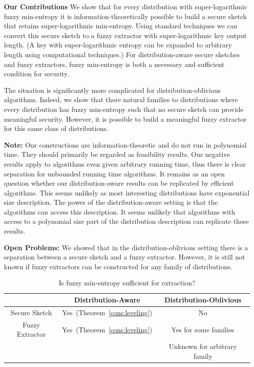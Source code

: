 \documentclass[11pt]{article}
\newcommand{\thref}[1]{\mbox{Theorem~\ref{#1}}}
\newcommand{\Hfuzz}{\mathrm{H}^{\mathtt{fuzz}}_{t,\infty}}
\begin{document}
\textbf{Our Contributions} We show that for every distribution with super-logarithmic fuzzy min-entropy it is information-theoretically possible to build a secure sketch that retains super-logarithmic min-entropy.  Using standard techniques we can convert this secure sketch to a fuzzy extractor with super-logarithmic key output length.  (A key with super-logarithmic entropy can be expanded to arbitrary length using computational techniques.)  For distribution-aware secure sketches and fuzzy extractors, fuzzy min-entropy is both a necessary and sufficient condition for security.  

The situation is significantly more complicated for distribution-oblivious algorithms.  Indeed, we show that there natural families to distributions where every distribution has fuzzy min-entropy such that no secure sketch can provide meaningful security.  However, it is possible to build a meaningful fuzzy extractor for this same class of distributions.

\textbf{Note:} Our constructions are information-theoretic and do not run in polynomial time.  They should primarily be regarded as feasibility results.  Our negative results apply to algorithms even given arbitrary running time, thus there is clear separation for unbounded running time algorithms.  It remains as an open question whether our distribution-aware results can be replicated by efficient algorithms.  This seems unlikely as most  interesting distributions have exponential size description.  The power of the distribution-aware setting is that the algorithms can access this description.  It seems unlikely that algorithms with access to a polynomial size part of the distribution description can replicate these results.

\textbf{Open Problems:} We showed that in the distribution-oblivious setting there is a separation between a secure sketch and a fuzzy extractor.  However, it is still not known if fuzzy extractors can be constructed for any family of distributions.

\begin{table}
\begin{center}
\begin{tabular}{c | c | c }
& Distribution-Aware & Distribution-Oblivious\\
\hline
Secure Sketch & Yes~(\thref{cons:leveling}) & No\\
\hline
Fuzzy Extractor & Yes~(\thref{cons:leveling}) & Yes for some families\\
& & Unknown for arbitrary family
\end{tabular}
\end{center}
\caption{Is fuzzy min-entropy sufficient for extraction?}
\label{tab:main results}
\end{table}
\end{document}
